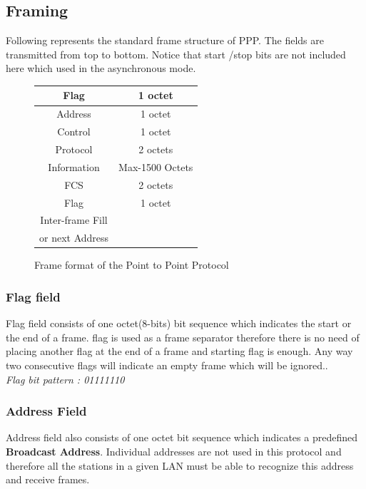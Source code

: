\documentclass[a4paper,11pt]{article}%
\begin{document}
\subsection{Framing}

Following represents the standard frame structure of PPP. The fields are transmitted from top to bottom. Notice that start /stop bits are not included here which used in the asynchronous mode.\\

\begin{figure}[!h]
	\centering
	\begin{tabular}{|c|c|}
	\hline
	Flag & 	1 octet\\\hline
	Address & 1 octet\\\hline
	Control & 1 octet\\\hline
	Protocol & 2 octets\\\hline
	Information& Max-1500 Octets\\\hline
	FCS & 2 octets\\\hline
	Flag & 1 octet\\\hline
	Inter-frame Fill& \\
	or next Address & \\\hline
\end{tabular}
\caption{Frame format of the Point to Point Protocol\cite{ppp}}	
\end{figure}



\subsubsection{Flag field}
Flag field consists of one octet(8-bits) bit sequence which indicates the start or the end of a frame. flag is used as a frame separator therefore there is no need of placing  another flag at the end of a frame and   starting flag is enough. Any way two consecutive flags will indicate an empty frame which will be ignored..\\

\textit{Flag bit pattern : 01111110} 

\subsubsection{Address Field}
Address field also consists of one octet bit sequence which indicates a predefined \textbf{Broadcast Address}. Individual addresses are not used in this protocol and therefore all the stations in a given LAN must be able to recognize this address and receive frames.\\
\end{document}
